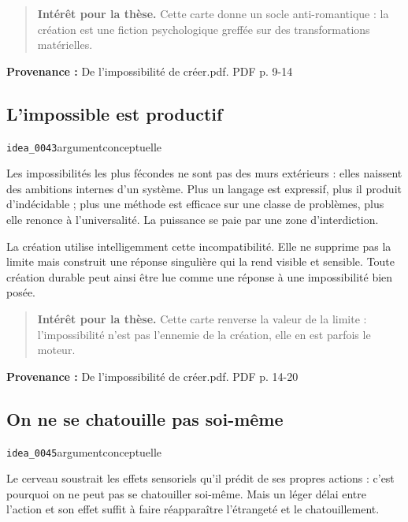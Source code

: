 \documentclass[10pt,a4paper]{article}
\begin{document}
\begin{quote}
\textbf{Intérêt pour la thèse.} Cette carte donne un socle anti-romantique : la création est une fiction psychologique greffée sur des transformations matérielles.
\end{quote}
{\footnotesize\color{metadata}\textbf{Provenance :} De l'impossibilité de créer.pdf. PDF p. 9-14\par}

\subsection{L'impossible est productif}
{\small\color{metadata} \texttt{idea\_0043}\quad\textbullet\quad argument\quad\textbullet\quad conceptuelle\par}

Les impossibilités les plus fécondes ne sont pas des murs extérieurs : elles naissent des ambitions internes d'un système. Plus un langage est expressif, plus il produit d'indécidable ; plus une méthode est efficace sur une classe de problèmes, plus elle renonce à l'universalité. La puissance se paie par une zone d'interdiction.

La création utilise intelligemment cette incompatibilité. Elle ne supprime pas la limite mais construit une réponse singulière qui la rend visible et sensible. Toute création durable peut ainsi être lue comme une réponse à une impossibilité bien posée.

\begin{quote}
\textbf{Intérêt pour la thèse.} Cette carte renverse la valeur de la limite : l'impossibilité n'est pas l'ennemie de la création, elle en est parfois le moteur.
\end{quote}
{\footnotesize\color{metadata}\textbf{Provenance :} De l'impossibilité de créer.pdf. PDF p. 14-20\par}

\subsection{On ne se chatouille pas soi-même}
{\small\color{metadata} \texttt{idea\_0045}\quad\textbullet\quad argument\quad\textbullet\quad conceptuelle\par}

Le cerveau soustrait les effets sensoriels qu'il prédit de ses propres actions : c'est pourquoi on ne peut pas se chatouiller soi-même. Mais un léger délai entre l'action et son effet suffit à faire réapparaître l'étrangeté et le chatouillement.
\end{document}

